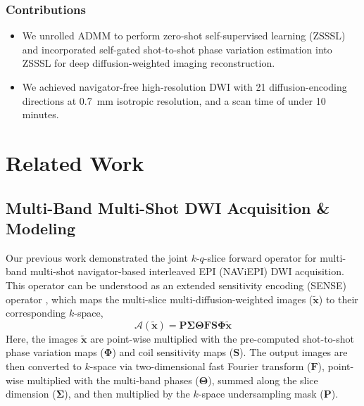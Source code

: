 \documentclass[journal,twoside,web]{ieeecolor}
\begin{document}
	\subsubsection*{Contributions}
	\begin{itemize}
		\item We unrolled ADMM to perform zero-shot self-supervised learning (ZSSSL)
		and incorporated self-gated shot-to-shot phase variation estimation into ZSSSL
		for deep diffusion-weighted imaging reconstruction.
		\item We achieved navigator-free high-resolution DWI with 21 diffusion-encoding
		directions at \SI{0.7}{\milli\meter} isotropic resolution,
		and a scan time of under 10 minutes.
	\end{itemize}


	\section{Related Work}


	\subsection{Multi-Band Multi-Shot DWI Acquisition \& Modeling} \label{SEC:FWD}

	Our previous work \cite{tan_2024_naviepi} demonstrated
	the joint $k$-$q$-slice forward operator
	for multi-band multi-shot navigator-based interleaved EPI (NAViEPI) DWI acquisition.
	This operator can be understood as
	an extended sensitivity encoding (SENSE) operator \cite{pruessmann_2001_gsense},
	which maps the multi-slice multi-diffusion-weighted images ($\mathbf{\tilde{x}}$)
	to their corresponding $k$-space,
	\begin{equation}
		\mathcal{A}(\mathbf{\tilde{x}}) = \mathbf{P \Sigma \Theta F S \Phi} \mathbf{\tilde{x}}
		\label{EQU:FWD}
	\end{equation}
	Here, the images $\mathbf{\tilde{x}}$ are point-wise multiplied
	with the pre-computed shot-to-shot phase variation maps ($\mathbf{\Phi}$)
	and coil sensitivity maps ($\mathbf{S}$).
	The output images are then converted to $k$-space
	via two-dimensional fast Fourier transform ($\mathbf{F}$),
	point-wise multiplied with the multi-band phases ($\mathbf{\Theta}$),
	summed along the slice dimension ($\mathbf{\Sigma}$),
	and then multiplied by the $k$-space undersampling mask ($\mathbf{P}$).
\end{document}

